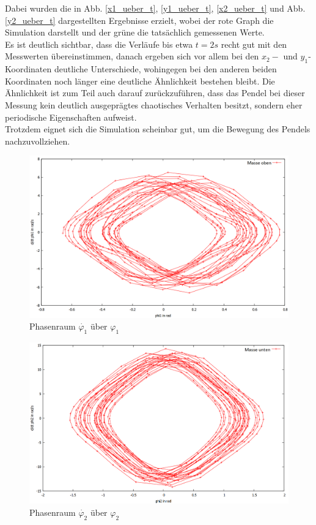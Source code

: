 Dabei wurden die in Abb. \ref{x1_ueber_t}, \ref{y1_ueber_t}, \ref{x2_ueber_t} und Abb. \ref{y2_ueber_t} dargestellten Ergebnisse erzielt, wobei der rote Graph die Simulation darstellt und der grüne die tatsächlich gemessenen Werte. \\
Es ist deutlich sichtbar, dass die Verläufe bis etwa $ t = 2 s $ recht gut mit den Messwerten übereinstimmen, danach ergeben sich vor allem bei den $x_2- $ und $ y_1$-Koordinaten deutliche Unterschiede, wohingegen bei den anderen beiden Koordinaten noch länger eine deutliche Ähnlichkeit bestehen bleibt. Die Ähnlichkeit ist zum Teil auch darauf zurückzuführen, dass das Pendel bei dieser Messung kein deutlich ausgeprägtes chaotisches Verhalten besitzt, sondern eher periodische Eigenschaften aufweist. \\
Trotzdem eignet sich die Simulation scheinbar gut, um die Bewegung des Pendels nachzuvollziehen. 

\begin{figure}
        \includegraphics[width=.9\textwidth]{images/phi1_ueberphi1_neu.png}
\caption{Phasenraum $\dot{\varphi_1} $ über $\varphi_1$}
\label{phi1}
\end{figure}

\begin{figure}
        \includegraphics[width=.9\textwidth]{images/phi2_ueberphi2_neu.png}
\caption{Phasenraum $\dot{\varphi_2} $ über $\varphi_2$}
\label{phi2}
\end{figure}

